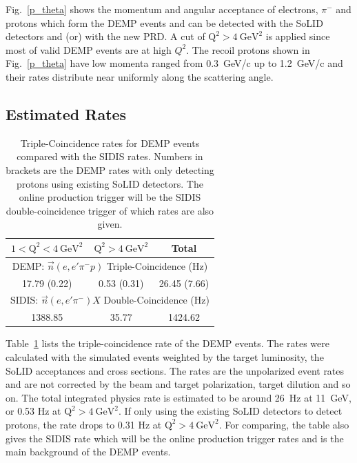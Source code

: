 Fig.~\ref{p_theta} shows the momentum and angular acceptance of electrons,
$\pi^{-}$ and protons which form the DEMP events and can be detected with the
SoLID detectors and (or) with the new PRD.  A cut of $\mathrm{Q^{2}>4~GeV^{2}}$
is applied since most of valid DEMP events are at high $Q^{2}$. The recoil
protons shown in Fig.~\ref{p_theta} have low momenta ranged from 0.3~GeV/c up
to 1.2~GeV/c and their rates distribute near uniformly along the scattering
angle.

\subsection{Estimated Rates}

\begin{table}[!ht]
\centering
\begin{tabular}{|c|c|c|}
 \hline
  $\mathrm{1<Q^{2}<4~GeV^{2}}$ & $\mathrm{Q^{2}>4~GeV^{2}}$ & Total\\
 \hline
\multicolumn{3}{|c|}{DEMP: $\vec{n}(e,e'\pi^{-}p)$ Triple-Coincidence (Hz)}\\
 \hline
 17.79 (0.22)   &  0.53 (0.31) & 26.45 (7.66)   \\
 \hline
\multicolumn{3}{|c|}{SIDIS: $\vec{n}(e,e'\pi^{-})X$ Double-Coincidence (Hz)}                                     \\
 \hline
        1388.85 & 35.77        & 1424.62   \\
 \hline
\end{tabular}
\caption[Triple-Coincidence rates for
  neutron-DEMP]{\footnotesize{Triple-Coincidence rates for DEMP events compared
    with the SIDIS rates. Numbers in brackets are the DEMP rates with only
    detecting protons using existing SoLID detectors. The online production
    trigger will be the SIDIS double-coincidence trigger of which rates are
    also given.}}
\label{rate_table}
\end{table} 
Table~\ref{rate_table} lists the triple-coincidence rate of the DEMP
events. The rates were calculated with the simulated events weighted by the
target luminosity, the SoLID acceptances and cross sections. The rates are the
unpolarized event rates and are not corrected by the beam and target
polarization, target dilution and so on. The total integrated physics rate is
estimated to be around 26~Hz at 11~GeV, or 0.53 Hz at
$\mathrm{Q^{2}>4~GeV^{2}}$. If only using the existing SoLID detectors to
detect protons, the rate drops to 0.31 Hz at $\mathrm{Q^{2}>4~GeV^{2}}$.  For
comparing, the table also gives the SIDIS rate which will be the online
production trigger rates and is the main background of the DEMP events.

